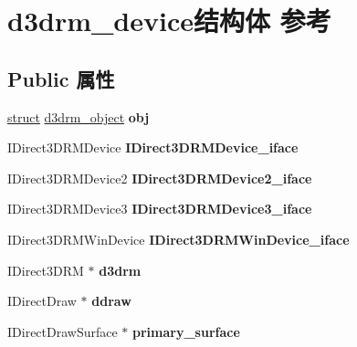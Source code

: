 \hypertarget{structd3drm__device}{}\section{d3drm\+\_\+device结构体 参考}
\label{structd3drm__device}
\subsection*{Public 属性}
\begin{DoxyCompactItemize}
\item 
\mbox{\label{structd3drm__device_a8a949122cc0ec5447a0540c7792d209e}} 
\hyperlink{interfacestruct}{struct} \hyperlink{structd3drm__object}{d3drm\+\_\+object} {\bfseries obj}
\item 
\mbox{\label{structd3drm__device_a029563d70b46af4c23218757f0af54dd}} 
I\+Direct3\+D\+R\+M\+Device {\bfseries I\+Direct3\+D\+R\+M\+Device\+\_\+iface}
\item 
\mbox{\label{structd3drm__device_ab0d0dfc4147805ac70a2f2faa4171bfa}} 
I\+Direct3\+D\+R\+M\+Device2 {\bfseries I\+Direct3\+D\+R\+M\+Device2\+\_\+iface}
\item 
\mbox{\label{structd3drm__device_abf91c0741ce0e129352bb7ce34a83bed}} 
I\+Direct3\+D\+R\+M\+Device3 {\bfseries I\+Direct3\+D\+R\+M\+Device3\+\_\+iface}
\item 
\mbox{\label{structd3drm__device_a646d3e68c75e2676383e6c105325ebec}} 
I\+Direct3\+D\+R\+M\+Win\+Device {\bfseries I\+Direct3\+D\+R\+M\+Win\+Device\+\_\+iface}
\item 
\mbox{\label{structd3drm__device_aea1d4226eb825a3796e79a8b2f138b76}} 
I\+Direct3\+D\+RM $\ast$ {\bfseries d3drm}
\item 
\mbox{\label{structd3drm__device_a1c53944cad879dd860f5d45531dc7a71}} 
I\+Direct\+Draw $\ast$ {\bfseries ddraw}
\item 
\mbox{\label{structd3drm__device_ae61ed49180192bba0ea3ec8a15a7b79e}} 
I\+Direct\+Draw\+Surface $\ast$ {\bfseries primary\+\_\+surface}

\end{DoxyCompactItemize}
